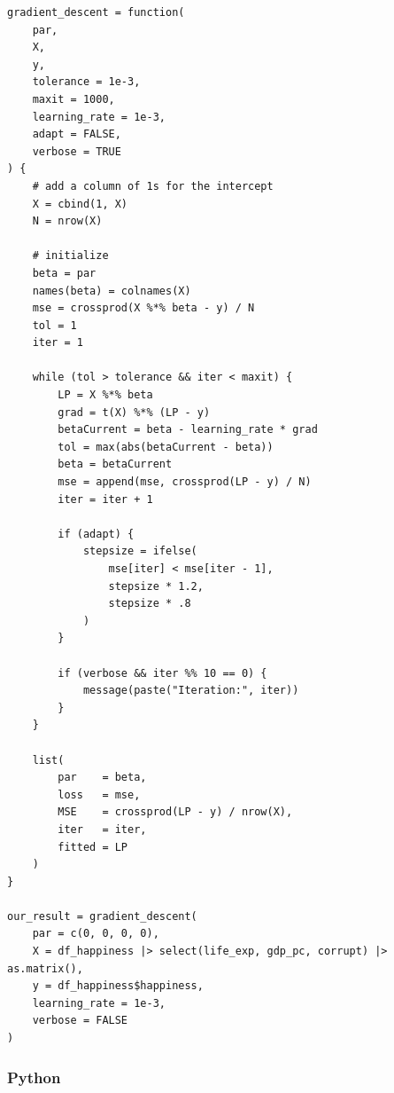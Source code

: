 \documentclass[
  letterpaper,
]{krantz}
\begin{document}
\begin{verbatim}
gradient_descent = function(
    par,
    X,
    y,
    tolerance = 1e-3,
    maxit = 1000,
    learning_rate = 1e-3,
    adapt = FALSE,
    verbose = TRUE
) {
    # add a column of 1s for the intercept
    X = cbind(1, X)
    N = nrow(X)

    # initialize
    beta = par
    names(beta) = colnames(X)
    mse = crossprod(X %*% beta - y) / N
    tol = 1
    iter = 1

    while (tol > tolerance && iter < maxit) {
        LP = X %*% beta
        grad = t(X) %*% (LP - y)
        betaCurrent = beta - learning_rate * grad
        tol = max(abs(betaCurrent - beta))
        beta = betaCurrent
        mse = append(mse, crossprod(LP - y) / N)
        iter = iter + 1

        if (adapt) {
            stepsize = ifelse(
                mse[iter] < mse[iter - 1],
                stepsize * 1.2,
                stepsize * .8
            )
        }

        if (verbose && iter %% 10 == 0) {
            message(paste("Iteration:", iter))
        }
    }

    list(
        par    = beta,
        loss   = mse,
        MSE    = crossprod(LP - y) / nrow(X),
        iter   = iter,
        fitted = LP
    )
}

our_result = gradient_descent(
    par = c(0, 0, 0, 0),
    X = df_happiness |> select(life_exp, gdp_pc, corrupt) |> as.matrix(),
    y = df_happiness$happiness,
    learning_rate = 1e-3,
    verbose = FALSE
)
\end{verbatim}

\subsubsection{Python}
\end{document}
